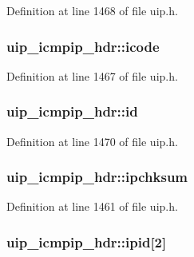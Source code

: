 Definition at line 1468 of file uip.h.

\hypertarget{structuip__icmpip__hdr_a266ea23d75c83f15b915ce54100e51c5}{
\subsubsection[{icode}]{ {\bf uip\_\-icmpip\_\-hdr::icode}}}
\label{structuip__icmpip__hdr_a266ea23d75c83f15b915ce54100e51c5}


Definition at line 1467 of file uip.h.

\hypertarget{structuip__icmpip__hdr_aa6d51f3fa5da9b7f9cd37ae69600c04a}{
\subsubsection[{id}]{ {\bf uip\_\-icmpip\_\-hdr::id}}}
\label{structuip__icmpip__hdr_aa6d51f3fa5da9b7f9cd37ae69600c04a}


Definition at line 1470 of file uip.h.

\hypertarget{structuip__icmpip__hdr_ababb9c2be394477af97f79507bcb4c86}{
\subsubsection[{ipchksum}]{ {\bf uip\_\-icmpip\_\-hdr::ipchksum}}}
\label{structuip__icmpip__hdr_ababb9c2be394477af97f79507bcb4c86}


Definition at line 1461 of file uip.h.

\hypertarget{structuip__icmpip__hdr_a308463cc7b3d45d2dbcdcedd4cde9bb9}{
\subsubsection[{ipid}]{ {\bf uip\_\-icmpip\_\-hdr::ipid}\mbox{[}2\mbox{]}}}
\label{structuip__icmpip__hdr_a308463cc7b3d45d2dbcdcedd4cde9bb9}


